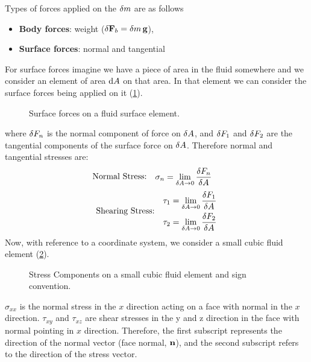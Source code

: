 %
Types of forces applied on the \(\mathop{}\!\delta m\) are as follows
%
\begin{itemize}
	\item \textbf{Body forces}: weight (\(\mathop{}\!\delta \mathbf{F}_b = \mathop{}\!\delta m\, \mathbf{g}\)),
	\item \textbf{Surface forces}: normal and tangential
\end{itemize}
%
For surface forces imagine we have a piece of area in the fluid somewhere and we consider an element of area \(\mathop{}\!\mathrm{d} A\) on that area.
In that element we can consider the surface forces being applied on it (\cref{fig:surface-forces-on-fluid-surface-element}).
%
\begin{figure}[ht]
	\begin{center}
	\end{center}
	\caption{Surface forces on a fluid surface element.}\label{fig:surface-forces-on-fluid-surface-element}
\end{figure}
%
where \(\mathop{}\!\delta F_n\) is the normal component of force on $\mathop{}\!\delta A$, and \(\mathop{}\!\delta F_1\) and \(\mathop{}\!\delta F_2\) are the tangential components of the surface force on \(\mathop{}\!\delta A\).
Therefore normal and tangential stresses are:
%
\begin{equation}
	\text{Normal Stress:}
	\begin{aligned}
		\quad \sigma_n & = \lim_{\deltaop A \to 0}{\f{\deltaop F_n}{\deltaop A}}
	\end{aligned} \\
	\label{eq:normal-surface-stress}
\end{equation}
%
\begin{equation}
	\text{Shearing Stress:}
	\begin{aligned}
		\quad \tau_1 & = \lim_{\deltaop A \to 0}{\f{\deltaop F_1}{\deltaop A}} \\
		\tau_2       & = \lim_{\deltaop A \to 0}{\f{\deltaop F_2}{\deltaop A}}
	\end{aligned}
	\label{eq:tangential-surface-stresses}
\end{equation}
%
Now, with reference to a coordinate system, we consider a small cubic fluid element (\cref{fig:cubic-fluid-element-stress}).
\begin{figure}[ht]
	\begin{center}
	\end{center}
	\caption{Stress Components on a small cubic fluid element and sign convention.}\label{fig:cubic-fluid-element-stress}
\end{figure}
%
\(\sigma_{xx}\) is the normal stress in the $x$ direction acting on a face with normal in the \(x\) direction.
\(\tau_{xy}\) and \(\tau_{xz}\) are shear stresses in the y and z direction in the face with normal pointing in \(x\) direction.
Therefore, the first subscript represents the direction of the normal vector (face normal, \(\mathbf{n}\)), and the second subscript refers to the direction of the stress vector.

